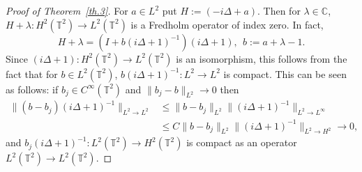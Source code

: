 \documentclass[AHL, Unicode, longabstracts]{cedram}
\newcommand{\CC}{{\mathbb C}}
\newcommand{\TT}{{\mathbb T}}
\newcommand{\TT}{{\mathbb T}}
\begin{document}
\begin{proof}[Proof of Theorem~\ref{th.3}]
For $a \in L^2$ put $H := (- i \Delta +a)$. Then for $ \lambda \in \CC $, $ H + \lambda : H^2 (\TT^2) \to L^2 (\TT^2) $ is a Fredholm operator of index zero. In fact,
\[
H + \lambda = (I + b (i \Delta + 1)^{-1}) (i \Delta + 1), \ \ b:= a + \lambda - 1.
\]
Since $ (i \Delta + 1) :H^2 (\TT^2) \to L^2 (\TT^2) $ is an isomorphism, this follows from the fact that for $ b \in L^2 (\TT^2) $, $ b (i \Delta + 1)^{-1} : L^2 \to L^2 $ is compact. This can be seen as follows: if $ b_j \in C^\infty (\TT^2) $ and $ \| b_j - b\|_{L^2 } \to 0 $ then
\[
\begin{split} \| (b - b_j) (i \Delta +1)^{-1} \|_{ L^2 \to L^2 } & \leq
\| b - b_j \|_{ L^2 } \| (i \Delta + 1)^{-1} \|_{ L^2 \to L^\infty } \\
&
\leq C \| b - b_j \|_{ L^2 } \| (i \Delta + 1)^{-1} \|_{ L^2 \to H^2 }
\to 0,
\end{split}
\]
and $ b_j (i \Delta + 1)^{-1} : L^2 (\TT^2) \to H^2 (\TT^2) $ is compact as an operator $ L^2 (\TT^2)\to L^2 (\TT^2) $.



\end{proof}
\end{document}
